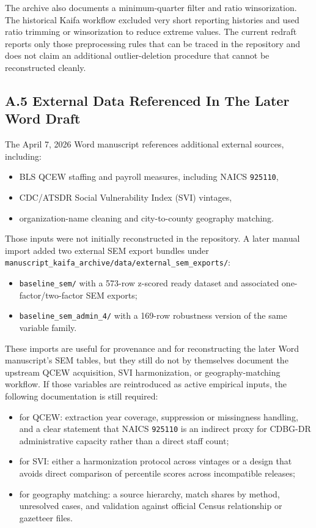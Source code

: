 \documentclass[
  letterpaper,
]{article}
\providecommand{\tightlist}{%
  \setlength{\itemsep}{0pt}\setlength{\parskip}{0pt}}
\begin{document}
The archive also documents a minimum-quarter filter and ratio
winsorization. The historical Kaifa workflow excluded very short
reporting histories and used ratio trimming or winsorization to reduce
extreme values. The current redraft reports only those preprocessing
rules that can be traced in the repository and does not claim an
additional outlier-deletion procedure that cannot be reconstructed
cleanly.

\subsection{A.5 External Data Referenced In The Later Word
Draft}\label{a.5-external-data-referenced-in-the-later-word-draft}

The April 7, 2026 Word manuscript references additional external
sources, including:

\begin{itemize}
\tightlist
\item
  BLS QCEW staffing and payroll measures, including NAICS
  \texttt{925110},
\item
  CDC/ATSDR Social Vulnerability Index (SVI) vintages,
\item
  organization-name cleaning and city-to-county geography matching.
\end{itemize}

Those inputs were not initially reconstructed in the repository. A later
manual import added two external SEM export bundles under
\texttt{manuscript\_kaifa\_archive/data/external\_sem\_exports/}:

\begin{itemize}
\tightlist
\item
  \texttt{baseline\_sem/} with a 573-row z-scored ready dataset and
  associated one-factor/two-factor SEM exports;
\item
  \texttt{baseline\_sem\_admin\_4/} with a 169-row robustness version of
  the same variable family.
\end{itemize}

These imports are useful for provenance and for reconstructing the later
Word manuscript's SEM tables, but they still do not by themselves
document the upstream QCEW acquisition, SVI harmonization, or
geography-matching workflow. If those variables are reintroduced as
active empirical inputs, the following documentation is still required:

\begin{itemize}
\tightlist
\item
  for QCEW: extraction year coverage, suppression or missingness
  handling, and a clear statement that NAICS \texttt{925110} is an
  indirect proxy for CDBG-DR administrative capacity rather than a
  direct staff count;
\item
  for SVI: either a harmonization protocol across vintages or a design
  that avoids direct comparison of percentile scores across incompatible
  releases;
\item
  for geography matching: a source hierarchy, match shares by method,
  unresolved cases, and validation against official Census relationship
  or gazetteer files.
\end{itemize}
\end{document}
